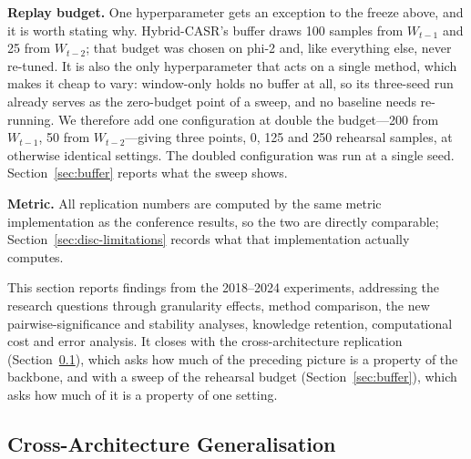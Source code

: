 \textbf{Replay budget.} One hyperparameter gets an exception to the freeze above, and it is worth stating why. Hybrid-CASR's buffer draws 100 samples from $W_{t-1}$ and 25 from $W_{t-2}$; that budget was chosen on phi-2 and, like everything else, never re-tuned. It is also the only hyperparameter that acts on a single method, which makes it cheap to vary: window-only holds no buffer at all, so its three-seed run already serves as the zero-budget point of a sweep, and no baseline needs re-running. We therefore add one configuration at double the budget---200 from $W_{t-1}$, 50 from $W_{t-2}$---giving three points, 0, 125 and 250 rehearsal samples, at otherwise identical settings. The doubled configuration was run at a single seed. Section~\ref{sec:buffer} reports what the sweep shows.

\textbf{Metric.} All replication numbers are computed by the same metric implementation as the conference results, so the two are directly comparable; Section~\ref{sec:disc-limitations} records what that implementation actually computes.



This section reports findings from the 2018--2024 experiments, addressing the research questions through granularity effects, method comparison, the new pairwise-significance and stability analyses, knowledge retention, computational cost and error analysis. It closes with the cross-architecture replication (Section~\ref{sec:cross-arch}), which asks how much of the preceding picture is a property of the backbone, and with a sweep of the rehearsal budget (Section~\ref{sec:buffer}), which asks how much of it is a property of one setting.



\subsection{Cross-Architecture Generalisation}
\label{sec:cross-arch}

